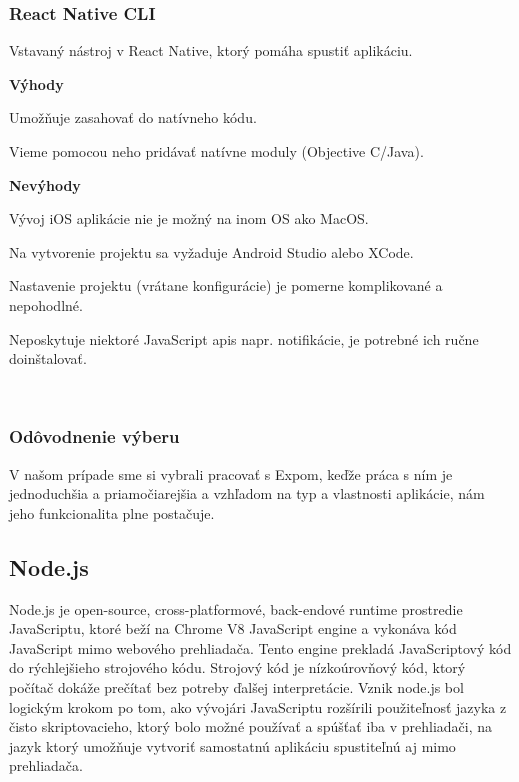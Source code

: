 \subsubsection{React Native CLI}
Vstavaný nástroj v React Native, ktorý pomáha spustiť aplikáciu. \newline

{\bf Výhody}
\begin{itemize}
{\item Umožňuje zasahovať do natívneho kódu.} 
{\item Vieme pomocou neho pridávať natívne moduly (Objective C/Java).} 
\end{itemize}

{\bf Nevýhody}
\begin{itemize}
{\item Vývoj iOS aplikácie nie je možný na inom OS ako MacOS.} 
{\item Na vytvorenie projektu sa vyžaduje Android Studio alebo XCode.}
{\item Nastavenie projektu (vrátane konfigurácie) je pomerne komplikované a nepohodlné.} 
{\item Neposkytuje niektoré JavaScript \acrshort{api}s napr. notifikácie, je potrebné ich ručne doinštalovať.} \\
\end{itemize}

\subsubsection{Odôvodnenie výberu}
V našom prípade sme si vybrali pracovať s Expom, keďže práca s ním je jednoduchšia a priamočiarejšia a vzhľadom na typ a vlastnosti aplikácie, nám jeho funkcionalita plne postačuje. \\

\subsection{Node.js}
Node.js je open-source, cross-platformové, back-endové runtime prostredie JavaScriptu, ktoré beží na Chrome V8 JavaScript engine a vykonáva kód JavaScript mimo webového prehliadača. Tento engine prekladá JavaScriptový kód do rýchlejšieho strojového kódu. Strojový kód je nízkoúrovňový kód, ktorý počítač dokáže prečítať bez potreby ďalšej interpretácie. Vznik node.js bol logickým krokom po tom, ako vývojári JavaScriptu rozšírili použiteľnosť jazyka z čisto skriptovacieho, ktorý bolo možné používať a spúšťať iba v prehliadači, na jazyk ktorý umožňuje vytvoriť samostatnú aplikáciu spustiteľnú aj mimo prehliadača. 


